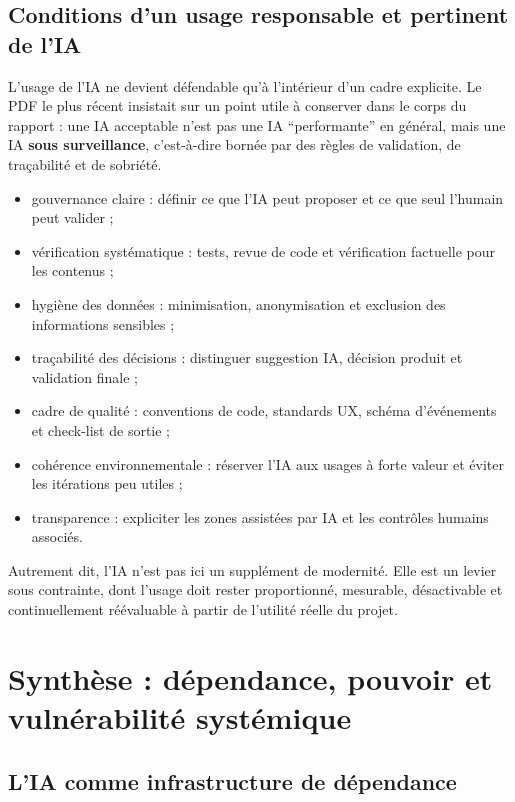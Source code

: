 \documentclass[
  10pt,
  a4paper,
  DIV=11,
  numbers=noendperiod,
  oneside]{scrreprt}
\providecommand{\tightlist}{%
  \setlength{\itemsep}{0pt}\setlength{\parskip}{0pt}}
\let\oldtextbf\textbf
\renewcommand{\textbf}[1]{\oldtextbf{\textcolor{cmmnavy}{#1}}}
\begin{document}
\subsection{Conditions d'un usage responsable et pertinent de
l'IA}\label{conditions-dun-usage-responsable-et-pertinent-de-lia}

L'usage de l'IA ne devient défendable qu'à l'intérieur d'un cadre
explicite. Le PDF le plus récent insistait sur un point utile à
conserver dans le corps du rapport : une IA acceptable n'est pas une IA
``performante'' en général, mais une IA \textbf{sous surveillance},
c'est-à-dire bornée par des règles de validation, de traçabilité et de
sobriété.

\begin{itemize}
\tightlist
\item
  gouvernance claire : définir ce que l'IA peut proposer et ce que seul
  l'humain peut valider ;
\item
  vérification systématique : tests, revue de code et vérification
  factuelle pour les contenus ;
\item
  hygiène des données : minimisation, anonymisation et exclusion des
  informations sensibles ;
\item
  traçabilité des décisions : distinguer suggestion IA, décision produit
  et validation finale ;
\item
  cadre de qualité : conventions de code, standards UX, schéma
  d'événements et check-list de sortie ;
\item
  cohérence environnementale : réserver l'IA aux usages à forte valeur
  et éviter les itérations peu utiles ;
\item
  transparence : expliciter les zones assistées par IA et les contrôles
  humains associés.
\end{itemize}

Autrement dit, l'IA n'est pas ici un supplément de modernité. Elle est
un levier sous contrainte, dont l'usage doit rester proportionné,
mesurable, désactivable et continuellement réévaluable à partir de
l'utilité réelle du projet.

\section{Synthèse : dépendance, pouvoir et vulnérabilité
systémique}\label{synthuxe8se-duxe9pendance-pouvoir-et-vulnuxe9rabilituxe9-systuxe9mique}

\subsection{L'IA comme infrastructure de
dépendance}\label{lia-comme-infrastructure-de-duxe9pendance}
\end{document}
